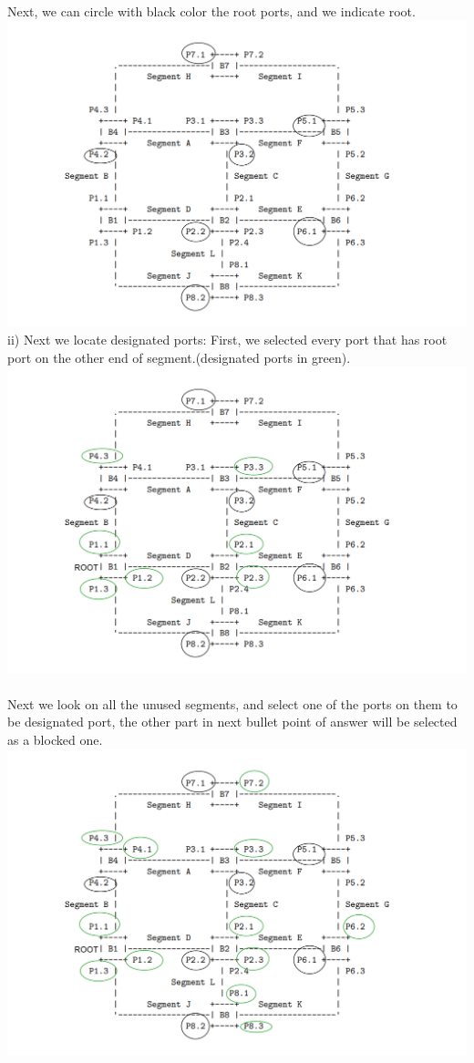 \documentclass[a4paper]{article}
\begin{document}
Next, we can circle with black color the root ports, and we indicate root.\\
\includegraphics[scale=0.2]{aww-board.png}\\
ii)
Next we locate designated ports:
First, we selected every port that has root port on the other end of segment.(designated ports in green).\\
\includegraphics[scale=0.2]{des-port.png}\\
\\
Next we look on all the unused segments, and select one of the ports on them to be designated port, the other part in next bullet point of answer will be selected as a blocked one.\\
\includegraphics[scale=0.2]{aww-board-2.png}
\end{document}

